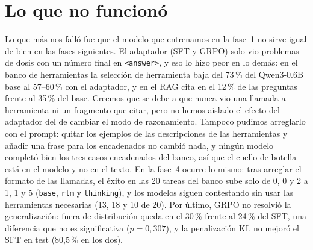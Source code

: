 \section{Lo que no funcionó}
Lo que más nos falló fue que el modelo que entrenamos en la fase~1 no sirve igual de bien en las fases siguientes. El adaptador (SFT y GRPO) solo vio problemas de dosis con un número final en \texttt{<answer>}, y eso lo hizo peor en lo demás: en el banco de herramientas la selección de herramienta baja del 73\,\% del Qwen3-0.6B base al 57--60\,\% con el adaptador, y en el RAG cita en el 12\,\% de las preguntas frente al 35\,\% del base. Creemos que se debe a que nunca vio una llamada a herramienta ni un fragmento que citar, pero no hemos aislado el efecto del adaptador del de cambiar el modo de razonamiento. Tampoco pudimos arreglarlo con el prompt: quitar los ejemplos de las descripciones de las herramientas y añadir una frase para los encadenados no cambió nada, y ningún modelo completó bien los tres casos encadenados del banco, así que el cuello de botella está en el modelo y no en el texto. En la fase~4 ocurre lo mismo: tras arreglar el formato de las llamadas, el éxito en las 20 tareas del banco sube solo de 0, 0 y 2 a 1, 1 y 5 (\texttt{base}, \texttt{rlm} y \texttt{thinking}), y los modelos siguen contestando sin usar las herramientas necesarias (13, 18 y 10 de 20). Por último, GRPO no resolvió la generalización: fuera de distribución queda en el 30\,\% frente al 24\,\% del SFT, una diferencia que no es significativa ($p=0{,}307$), y la penalización KL no mejoró el SFT en test (80,5\,\% en los dos).
